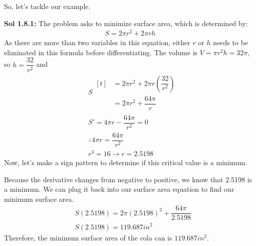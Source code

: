 So, let's tackle our example. \par

\begin{tcolorbox}[solution]
    \textbf{Sol 1.8.1: } The problem asks to minimize surface area, which is determined by: \begin{align*}
        S = 2\pi r^2 + 2\pi rh 
    \end{align*}
    As there are more than two variables in this equation, either $r$ or $h$ needs to be eliminated in this formula before differentiating. The volume is $V = \pi r^2h = 32\pi$, so $h = \dfrac{32}{r^2}$ and \begin{align*}
        & S \begin{aligned}[t]
            & = 2\pi r^2 + 2\pi r\left(\dfrac{32}{r^2}\right) \\[11pt]
            & = 2\pi r^2 + \dfrac{64\pi}{r}
        \end{aligned} \\[11pt]
        & S' = 4\pi r - \dfrac{64\pi}{r^2} = 0 \\[11pt]
        & \therefore 4\pi r = \dfrac{64\pi}{r^2} \\[11pt]
        & r^3 = 16 \rightarrow r = 2.5198
    \end{align*}
    Now, let's make a sign pattern to determine if this critical value is a minimum. \\
    \begin{center}
    \end{center} \vspace{11pt}
    Because the derivative changes from negative to positive, we know that 2.5198 is a minimum. We can plug it back into our surface area equation to find our minimum surface area. \begin{align*}
        & S(2.5198) = 2\pi(2.5198)^2 + \dfrac{64\pi}{2.5198} \\[11pt]
        & S(2.5198) = 119.687 \si{in^2}
    \end{align*}
    Therefore, the minimum surface area of the cola can is $\boxed{119.687 \si{in^2}}$.
\end{tcolorbox}

